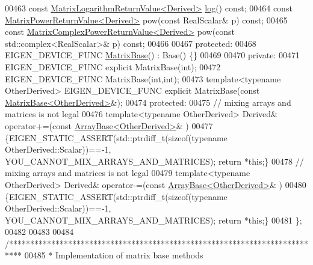 \begin{DoxyCode}
00463     \textcolor{keyword}{const} \hyperlink{class_eigen_1_1_matrix_logarithm_return_value}{MatrixLogarithmReturnValue<Derived>} 
      \hyperlink{structlog}{log}() \textcolor{keyword}{const};
00464     \textcolor{keyword}{const} \hyperlink{class_eigen_1_1_matrix_power_return_value}{MatrixPowerReturnValue<Derived>} pow(\textcolor{keyword}{const} RealScalar& p) \textcolor{keyword}{const};
00465     \textcolor{keyword}{const} \hyperlink{class_eigen_1_1_matrix_complex_power_return_value}{MatrixComplexPowerReturnValue<Derived>} pow(\textcolor{keyword}{const} 
      std::complex<RealScalar>& p) \textcolor{keyword}{const};
00466 
00467   \textcolor{keyword}{protected}:
00468     EIGEN\_DEVICE\_FUNC \hyperlink{group___core___module_class_eigen_1_1_matrix_base}{MatrixBase}() : Base() \{\}
00469 
00470   \textcolor{keyword}{private}:
00471     EIGEN\_DEVICE\_FUNC \textcolor{keyword}{explicit} MatrixBase(\textcolor{keywordtype}{int});
00472     EIGEN\_DEVICE\_FUNC MatrixBase(\textcolor{keywordtype}{int},\textcolor{keywordtype}{int});
00473     \textcolor{keyword}{template}<\textcolor{keyword}{typename} OtherDerived> EIGEN\_DEVICE\_FUNC \textcolor{keyword}{explicit} MatrixBase(\textcolor{keyword}{const} 
      \hyperlink{group___core___module_class_eigen_1_1_matrix_base}{MatrixBase<OtherDerived>}&);
00474   \textcolor{keyword}{protected}:
00475     \textcolor{comment}{// mixing arrays and matrices is not legal}
00476     \textcolor{keyword}{template}<\textcolor{keyword}{typename} OtherDerived> Derived& operator+=(\textcolor{keyword}{const} 
      \hyperlink{group___core___module_class_eigen_1_1_array_base}{ArrayBase<OtherDerived>}& )
00477     \{EIGEN\_STATIC\_ASSERT(std::ptrdiff\_t(\textcolor{keyword}{sizeof}(\textcolor{keyword}{typename} OtherDerived::Scalar))==-1,
      YOU\_CANNOT\_MIX\_ARRAYS\_AND\_MATRICES); \textcolor{keywordflow}{return} *\textcolor{keyword}{this};\}
00478     \textcolor{comment}{// mixing arrays and matrices is not legal}
00479     \textcolor{keyword}{template}<\textcolor{keyword}{typename} OtherDerived> Derived& operator-=(\textcolor{keyword}{const} 
      \hyperlink{group___core___module_class_eigen_1_1_array_base}{ArrayBase<OtherDerived>}& )
00480     \{EIGEN\_STATIC\_ASSERT(std::ptrdiff\_t(\textcolor{keyword}{sizeof}(\textcolor{keyword}{typename} OtherDerived::Scalar))==-1,
      YOU\_CANNOT\_MIX\_ARRAYS\_AND\_MATRICES); \textcolor{keywordflow}{return} *\textcolor{keyword}{this};\}
00481 \};
00482 
00483 
00484 \textcolor{comment}{/***************************************************************************}
00485 \textcolor{comment}{* Implementation of matrix base methods}

\end{DoxyCode}
